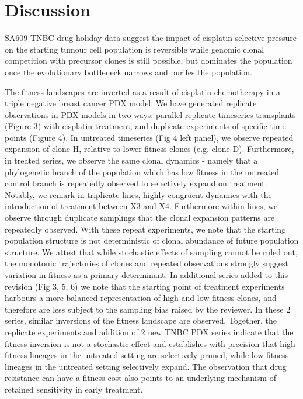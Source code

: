 \section{Discussion}
SA609 TNBC drug holiday data suggest the impact of cisplatin selective pressure on the starting tumour cell population is reversible while genomic clonal competition with precursor clones is still possible, but dominates the population once the evolutionary bottleneck narrows and purifes the population.

The fitness landscapes are inverted as a result of cisplatin chemotherapy in a triple negative breast cancer PDX model.  We have generated replicate observations in PDX models in two ways: parallel replicate timeseries transplants (Figure 3) with cisplatin treatment, and duplicate experiments of specific time points (Figure 4). In untreated timeseries (Fig 4 left panel), we observe repeated expansion of clone H, relative to lower fitness clones (e.g. clone D). Furthermore, in treated series, we observe the same clonal dynamics - namely that a phylogenetic branch of the population which has low fitness in the untreated control branch is repeatedly observed to selectively expand on treatment.  Notably, we remark in triplicate lines,  highly congruent dynamics with the introduction of treatment between X3 and X4.  Furthermore within lines, we observe through duplicate samplings that the clonal expansion patterns are repeatedly observed. With these repeat experiments, we note that the starting population structure is not deterministic of clonal abundance of future population structure.  We attest that while stochastic effects of sampling cannot be ruled out, the monotonic trajectories of clones and repeated observations strongly suggest variation in fitness as a primary determinant. In additional series added to this revision (Fig 3, 5, 6) we note that the starting point of treatment experiments harbours a more balanced representation of high and low fitness clones, and therefore are less subject to the sampling bias raised by the reviewer.  In these 2 series, similar inversions of the fitness landscape are observed.  Together, the replicate experiments and addition of 2 new TNBC PDX series indicate that the fitness inversion is not a stochastic effect and establishes with precision that high fitness lineages in the untreated setting are selectively pruned, while low fitness lineages in the untreated setting selectively expand. The observation that drug resistance can have a fitness cost also points to an underlying mechanism of retained sensitivity in early treatment.




